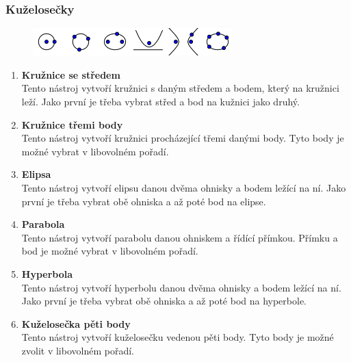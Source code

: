 \documentclass[11pt]{article}
\begin{document}
    \subsubsection{Kuželosečky}
    \vspace{-10pt}
    \begin{figure}[h]
        \begin{center}
        \includegraphics[scale=0.5]{imgs/conic_tools.png}
        \end{center}
    \end{figure}
    \vspace{-25pt}
    \begin{enumerate}
        \item{\bf Kružnice se středem}\\
        Tento nástroj vytvoří kružnici s daným středem a bodem, který na kružnici leží. Jako první je třeba vybrat střed a bod na kužnici jako druhý.
        \item{\bf Kružnice třemi body}\\
        Tento nástroj vytvoří kružnici procházející třemi danými body. Tyto body je možné vybrat v libovolném pořadí.
        \item{\bf Elipsa}\\
        Tento nástroj vytvoří elipsu danou dvěma ohnisky a bodem ležící na ní. Jako první je třeba vybrat obě ohniska a až poté bod na elipse.
        \item{\bf Parabola}\\
        Tento nástroj vytvoří parabolu danou ohniskem a řídící přímkou. Přímku a bod je možné vybrat v libovolném pořadí.
        \item{\bf Hyperbola}\\
        Tento nástroj vytvoří hyperbolu danou dvěma ohnisky a bodem ležící na ní. Jako první je třeba vybrat obě ohniska a až poté bod na hyperbole.
        \item{\bf Kuželosečka pěti body}\\
        Tento nástroj vytvoří kuželosečku vedenou pěti body. Tyto body je možné zvolit v libovolném pořadí.
    \end{enumerate}
\end{document}
